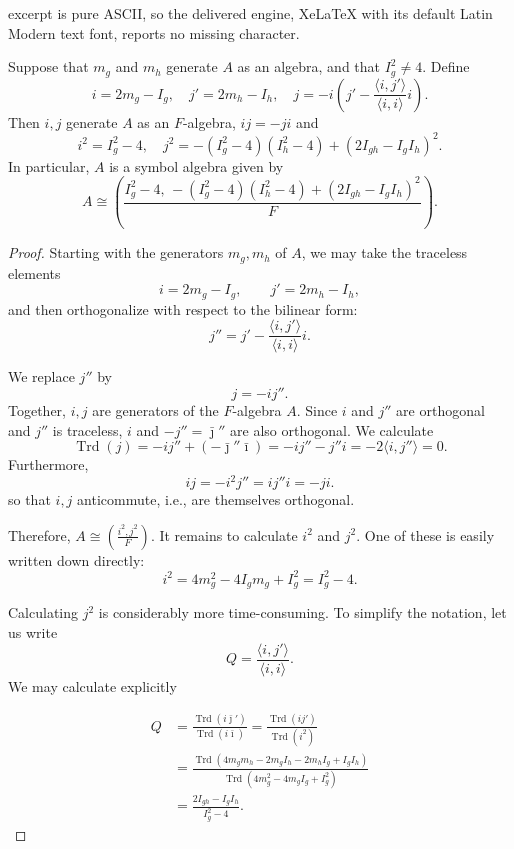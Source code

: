 \documentclass[10pt,a4paper]{amsart}
\newcommand{\Trd}{\operatorname{Trd}}
\newcommand{\iso}{\cong}
\begin{document}
excerpt is pure ASCII, so the delivered engine, XeLaTeX with its default Latin Modern text font, reports no missing character.
\begin{prop} \label{pr:symbolAlgebra}
 Suppose that $m_g$ and $m_h$ generate $A$ as an algebra, and that $I_g^2
  \neq 4$. Define
  \[ i = 2m_g  - I_g, \quad j' = 2m_h - I_h, \quad j= -i\left(j' - \frac{\langle i,j' \rangle}{\langle i , i \rangle }
      i \right).\]
  Then $i,j$ generate $A$ as an $F$-algebra, $ij=-ji$ and
  \[ i^2 = I_g^2 - 4, \quad j^2 = -(I_g^2 -4)(I_h^2-4) + (2I_{gh} - I_gI_h)^2. \]
  In particular, $A$ is a symbol algebra given by
  \[ A \iso \left( \frac{I_g^2 - 4, \, -(I_g^2 -4)(I_h^2-4) + (2I_{gh} - I_gI_h)^2}{F} \right).\]  
\end{prop}

\begin{proof}
Starting with the generators $m_g, m_h$ of $A$, we may take the traceless elements
\[ i = 2m_g - I_g,\qquad j'= 2 m_h -  I_h, \]
and then orthogonalize with respect to the bilinear form:
\[ j'' = j' - \frac{ \langle i, j' \rangle}{\langle i, i \rangle} i. \]

\noindent We replace $j''$ by
\[ j = -i j''. \]
Together, $i, j$ are generators of the $F$-algebra $A$. Since $i$ and $j''$ are orthogonal and $j''$ is traceless,  $i$ and $-j'' = \bar \jmath''$ are also orthogonal. We calculate
\[ \Trd(j) = -ij'' + (-\bar \jmath'' \bar \imath) = -ij'' -j''i =  -2 \langle i, j'' \rangle = 0. \]
Furthermore,
\[ ij = -i^2 j'' = ij''i = -ji. \]
so that $i,j$ anticommute, i.e., are themselves orthogonal.

Therefore, $A \iso \left( \frac{ i^2, j^2 }{F} \right)$. It remains to calculate $i^2$ and $j^2$. One of these is easily written down directly:
 \[ i^2 = 4 m_g^2 - 4I_g m_g + I_g^2 = I_g^2 - 4. \]

Calculating $j^2$ is considerably more time-consuming. To simplify the notation, let us write
\[ Q = \frac{ \langle i, j' \rangle}{\langle i, i \rangle}. \] We may calculate explicitly

\begin{equation}
  \begin{aligned}  Q & = \frac{\Trd(i \bar \jmath')}{\Trd(i\bar \imath)} = \frac{\Trd(ij')}{\Trd(i^2)}\\
    &= \frac{\Trd(4m_gm_h -2m_gI_h -2m_hI_g +I_gI_h)}{\Trd(4m_g^2 -4m_gI_g +I^2_g) } \\
    &= \frac{2I_{gh} - I_g I_h}{I_g^2-4}.
  \end{aligned}
  \label{eq:17}
\end{equation}


\end{proof}
\end{document}

